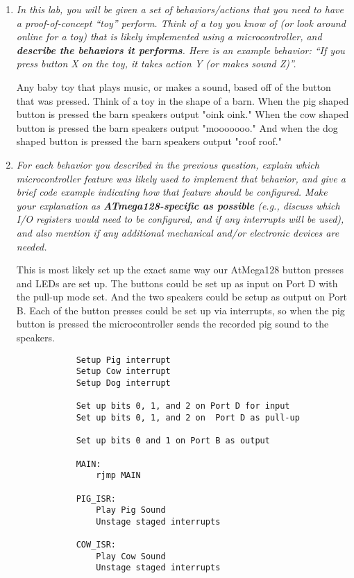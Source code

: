 \documentclass[12pt,letterpaper]{article}
\begin{document}
	\begin{enumerate}
		\item
		\textit{In this lab, you will be given a set of behaviors/actions that you need to have a proof-of-concept “toy” perform. 
		Think of a toy you know of (or look around online for a toy) that is likely implemented using a microcontroller, and \textbf{describe the behaviors it performs}. 
		Here is an example behavior: “If you press button X on the toy, it takes action Y (or makes sound Z)”.}
		
		Any baby toy that plays music, or makes a sound, based off of the button that was pressed.
		Think of a toy in the shape of a barn.
		When the pig shaped button is pressed the barn speakers output "oink oink."
		When the cow shaped button is pressed the barn speakers output "mooooooo."
		And when the dog shaped button is pressed the barn speakers output "roof roof."
		
		
		\item
		\textit{For each behavior you described in the previous question, explain which microcontroller feature was likely used to implement that behavior, and give a brief code example indicating how that feature should be configured. 
		Make your explanation as \textbf{ATmega128-specific as possible} (e.g., discuss which I/O registers would need to be configured, and if any interrupts will be used), and also mention if any additional mechanical and/or electronic devices are needed.}
		
		This is most likely set up the exact same way our AtMega128 button presses and LEDs are set up.
		The buttons could be set up as input on Port D with the pull-up mode set.
		And the two speakers could be setup as output on Port B.
		Each of the button presses could be set up via interrupts, so when the pig button is pressed the microcontroller sends the recorded pig sound to the speakers. 
		
		\begin{verbatim}
			Setup Pig interrupt
			Setup Cow interrupt
			Setup Dog interrupt
			
			Set up bits 0, 1, and 2 on Port D for input
			Set up bits 0, 1, and 2 on  Port D as pull-up
			
			Set up bits 0 and 1 on Port B as output
			
			MAIN:
				rjmp MAIN
				
			PIG_ISR:
				Play Pig Sound
				Unstage staged interrupts
			
			COW_ISR:
				Play Cow Sound
				Unstage staged interrupts
			

\end{verbatim}
\end{enumerate}
\end{document}
